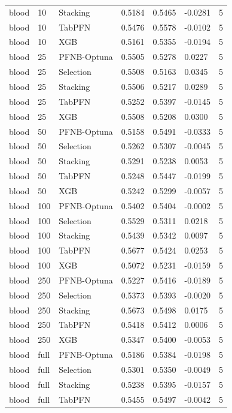 \begin{tabular}{llllllr}
blood & 10 & Stacking & 0.5184 & 0.5465 & -0.0281 & 5 \\
blood & 10 & TabPFN & 0.5476 & 0.5578 & -0.0102 & 5 \\
blood & 10 & XGB & 0.5161 & 0.5355 & -0.0194 & 5 \\
blood & 25 & PFNB-Optuna & 0.5505 & 0.5278 & 0.0227 & 5 \\
blood & 25 & Selection & 0.5508 & 0.5163 & 0.0345 & 5 \\
blood & 25 & Stacking & 0.5506 & 0.5217 & 0.0289 & 5 \\
blood & 25 & TabPFN & 0.5252 & 0.5397 & -0.0145 & 5 \\
blood & 25 & XGB & 0.5508 & 0.5208 & 0.0300 & 5 \\
blood & 50 & PFNB-Optuna & 0.5158 & 0.5491 & -0.0333 & 5 \\
blood & 50 & Selection & 0.5262 & 0.5307 & -0.0045 & 5 \\
blood & 50 & Stacking & 0.5291 & 0.5238 & 0.0053 & 5 \\
blood & 50 & TabPFN & 0.5248 & 0.5447 & -0.0199 & 5 \\
blood & 50 & XGB & 0.5242 & 0.5299 & -0.0057 & 5 \\
blood & 100 & PFNB-Optuna & 0.5402 & 0.5404 & -0.0002 & 5 \\
blood & 100 & Selection & 0.5529 & 0.5311 & 0.0218 & 5 \\
blood & 100 & Stacking & 0.5439 & 0.5342 & 0.0097 & 5 \\
blood & 100 & TabPFN & 0.5677 & 0.5424 & 0.0253 & 5 \\
blood & 100 & XGB & 0.5072 & 0.5231 & -0.0159 & 5 \\
blood & 250 & PFNB-Optuna & 0.5227 & 0.5416 & -0.0189 & 5 \\
blood & 250 & Selection & 0.5373 & 0.5393 & -0.0020 & 5 \\
blood & 250 & Stacking & 0.5673 & 0.5498 & 0.0175 & 5 \\
blood & 250 & TabPFN & 0.5418 & 0.5412 & 0.0006 & 5 \\
blood & 250 & XGB & 0.5347 & 0.5400 & -0.0053 & 5 \\
blood & full & PFNB-Optuna & 0.5186 & 0.5384 & -0.0198 & 5 \\
blood & full & Selection & 0.5301 & 0.5350 & -0.0049 & 5 \\
blood & full & Stacking & 0.5238 & 0.5395 & -0.0157 & 5 \\
blood & full & TabPFN & 0.5455 & 0.5497 & -0.0042 & 5 \\

\end{tabular}
